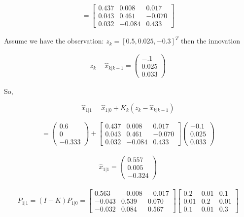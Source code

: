 \[\begin{aligned}
=
\begin{bmatrix}
0.437 & 0.008 & 0.017\\
 0.043 & 0.461 & -0.070\\
 0.032 & -0.084 & 0.433
\end{bmatrix}
\end{aligned}\]

Assume we have the observation: \(z_k = [0.5, 0.025, -0.3]^T\) then the
innovation

\[\begin{aligned}
z_k - \hat{x}_{k|k-1} = \begin{pmatrix}-.1\\ 0.025\\ 0.033\end{pmatrix}
\end{aligned}\]

So,

\[\hat{x}_{1|1} = \hat{x}_{1|0} + K_k \left(z_k - \hat{x}_{k|k-1}\right)\]

\[\begin{aligned}
=
\begin{pmatrix}
 0.6 \\
 0 \\
-0.333
\end{pmatrix}
+
\begin{bmatrix}
0.437 & 0.008 & 0.017\\
 0.043 & 0.461 & -0.070\\
 0.032 & -0.084 & 0.433
\end{bmatrix}
\begin{pmatrix}
 -0.1\\
 0.025 \\
0.033
\end{pmatrix}
\end{aligned}\]

\[\begin{aligned}
\hat{x}_{1|1}
=
\begin{pmatrix}
0.557\\
 0.005\\
 -0.324
\end{pmatrix}
\end{aligned}\]

\[\begin{aligned}
P_{1|1} = (I - K ) P_{1|0} =
\begin{bmatrix}
0.563 & -0.008 & -0.017\\
 -0.043 & 0.539 & 0.070\\
 -0.032 & 0.084 & 0.567
\end{bmatrix}
\begin{bmatrix}
0.2 & 0.01 & 0.1 \\
0.01 & 0.2 & 0.01  \\
0.1 & 0.01 & 0.3
\end{bmatrix}
\end{aligned}\]

